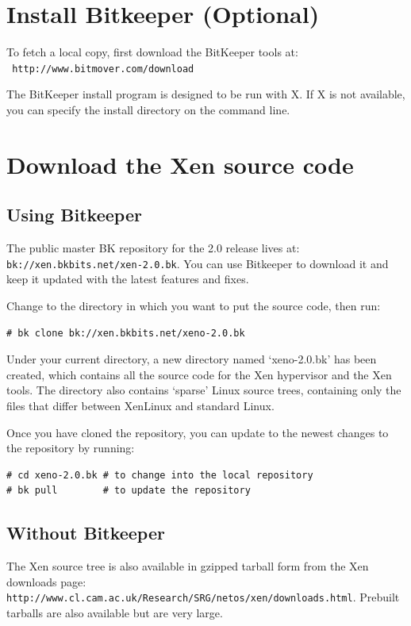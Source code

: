 \documentclass[11pt,twoside,final,openright]{xenstyle}
\begin{document}
\section{Install Bitkeeper (Optional)}

To fetch a local copy, first download the BitKeeper tools at: \\ {\tt
http://www.bitmover.com/download }

The BitKeeper install program is designed to be run with X.  If X is
not available, you can specify the install directory on the command
line.

\section{Download the Xen source code}

\subsection{Using Bitkeeper}

The public master BK repository for the 2.0 release lives at: \\
{\tt bk://xen.bkbits.net/xen-2.0.bk}.  You can use Bitkeeper to
download it and keep it updated with the latest features and fixes.

Change to the directory in which you want to put the source code, then
run:
\begin{verbatim}
# bk clone bk://xen.bkbits.net/xeno-2.0.bk
\end{verbatim}

Under your current directory, a new directory named `xeno-2.0.bk'
has been created, which contains all the source code for the Xen
hypervisor and the Xen tools.  The directory also contains `sparse'
Linux source trees, containing only the files that differ between
XenLinux and standard Linux.

Once you have cloned the repository, you can update to the newest
changes to the repository by running:
\begin{verbatim}
# cd xeno-2.0.bk # to change into the local repository
# bk pull        # to update the repository
\end{verbatim}

\subsection{Without Bitkeeper}

The Xen source tree is also available in gzipped tarball form from the
Xen downloads page:\\
{\tt http://www.cl.cam.ac.uk/Research/SRG/netos/xen/downloads.html}.
Prebuilt tarballs are also available but are very large.
\end{document}
